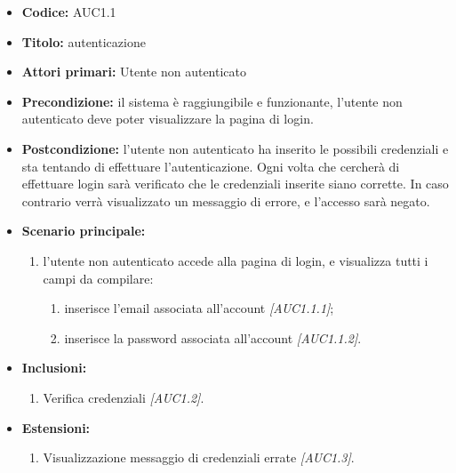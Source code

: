 \documentclass[casi-duso]{subfiles}
\begin{document}
\begin{itemize}
  \item \textbf{Codice:} AUC1.1
  \item \textbf{Titolo:} autenticazione
  \item \textbf{Attori primari:} Utente non autenticato
  \item \textbf{Precondizione:} il sistema è raggiungibile e funzionante, l'utente non autenticato deve poter visualizzare la pagina di login.
  \item \textbf{Postcondizione:} l'utente non autenticato ha inserito le possibili credenziali e sta tentando di effettuare l'autenticazione. Ogni volta che cercherà di effettuare
        login sarà verificato che le credenziali inserite siano corrette. In caso contrario verrà visualizzato un messaggio di errore, e l'accesso sarà negato.
  \item \textbf{Scenario principale:}
  \begin{enumerate}
    \item  l'utente non autenticato accede alla pagina di login, e visualizza tutti i campi da compilare:
    \begin{enumerate}
      \item inserisce l’email associata all’account \emph{[AUC1.1.1]};
      \item inserisce la password associata all’account \emph{[AUC1.1.2]}.
    \end{enumerate}
  \end{enumerate}
  \item \textbf{Inclusioni:}
  \begin{enumerate}
    \item Verifica credenziali \emph{[AUC1.2]}.
  \end{enumerate}
  \item \textbf{Estensioni:}
  \begin{enumerate}
    \item Visualizzazione messaggio di credenziali errate \emph{[AUC1.3]}.
  \end{enumerate}
\end{itemize}
\end{document}
